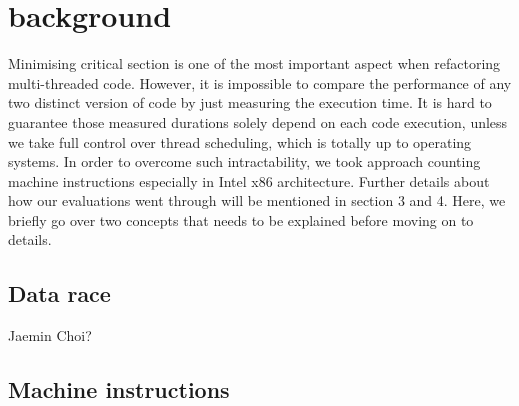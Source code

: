 \section{background}

Minimising critical section is one of the most important aspect when refactoring multi-threaded code. However, it is impossible to compare the performance of any two distinct version of code by just measuring the execution time. It is hard to guarantee those measured durations solely depend on each code execution, unless we take full control over thread scheduling, which is totally up to operating systems. In order to overcome such intractability, we took approach counting machine instructions especially in Intel x86 architecture. Further details about how our evaluations went through will be mentioned in section 3 and 4. Here, we briefly go over two concepts that needs to be explained before moving on to details.

\subsection{Data race}
Jaemin Choi?

\subsection{Machine instructions}